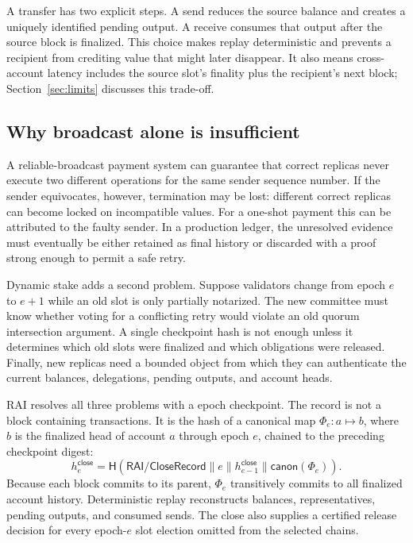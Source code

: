 \documentclass[sigplan,review,anonymous]{acmart}
\newcommand{\sys}{\textsc{RAI}\xspace}
\newcommand{\hash}{\mathsf{H}}
\newcommand{\canon}{\mathsf{canon}}
\newcommand{\frontier}{\Phi}
\newcommand{\closehash}{h^{\mathsf{close}}}
\begin{document}
A transfer has two explicit steps.  A send reduces the source balance and creates a uniquely identified pending output.  A receive consumes that output after the source block is finalized.  This choice makes replay deterministic and prevents a recipient from crediting value that might later disappear.  It also means cross-account latency includes the source slot's finality plus the recipient's next block; Section~\ref{sec:limits} discusses this trade-off.

\subsection{Why broadcast alone is insufficient}

A reliable-broadcast payment system can guarantee that correct replicas never execute two different operations for the same sender sequence number.  If the sender equivocates, however, termination may be lost: different correct replicas can become locked on incompatible values.  For a one-shot payment this can be attributed to the faulty sender.  In a production ledger, the unresolved evidence must eventually be either retained as final history or discarded with a proof strong enough to permit a safe retry.

Dynamic stake adds a second problem.  Suppose validators change from epoch $e$ to $e+1$ while an old slot is only partially notarized.  The new committee must know whether voting for a conflicting retry would violate an old quorum intersection argument.  A single checkpoint hash is not enough unless it determines which old slots were finalized and which obligations were released.  Finally, new replicas need a bounded object from which they can authenticate the current balances, delegations, pending outputs, and account heads.

\sys resolves all three problems with a epoch checkpoint.  The record is not a block containing transactions.  It is the hash of a canonical map $\frontier_e:a\mapsto b$, where $b$ is the finalized head of account $a$ through epoch $e$, chained to the preceding checkpoint digest:
\begin{equation}
  \closehash_e = \hash(\textsf{RAI/CloseRecord}\parallel e\parallel
  \closehash_{e-1}\parallel\canon(\frontier_e)).
  \label{eq:closehash}
\end{equation}
Because each block commits to its parent, $\frontier_e$ transitively commits to all finalized account history.  Deterministic replay reconstructs balances, representatives, pending outputs, and consumed sends.  The close also supplies a certified release decision for every epoch-$e$ slot election omitted from the selected chains.
\end{document}
